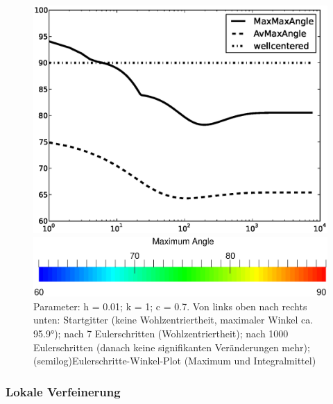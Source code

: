 \begin{figure}
\begin{minipage}[t]{0.49\textwidth}
        \end{minipage}
        \hfill
        \begin{minipage}[t]{0.5\textwidth}
        \includegraphics[width=\textwidth]{bilder/meshCorrector/step7500_AnglesHeine51c_1k_h001_k10_c07.eps}
        \end{minipage}
        \begin{minipage}[t]{\textwidth}
        \includegraphics[width=\textwidth]{bilder/meshCorrector/Angle6090_scaleBar.eps}
        \end{minipage}
        \caption[Gittergenerierung: Ellipsoid]
                {Parameter: h = 0.01; k = 1; c = 0.7. 
                 Von links oben nach rechts unten: 
                 Startgitter (keine Wohlzentriertheit, maximaler Winkel ca. \ang{95.9}); 
                 nach 7 Eulerschritten (Wohlzentriertheit);
                 nach 1000 Eulerschritten (danach keine signifikanten Veränderungen mehr);
                 (semilog)Eulerschritte-Winkel-Plot (Maximum und Integralmittel)}
         \label{AbbEllipsoid}
      \end{figure}

    \subsubsection{Lokale Verfeinerung}
     
